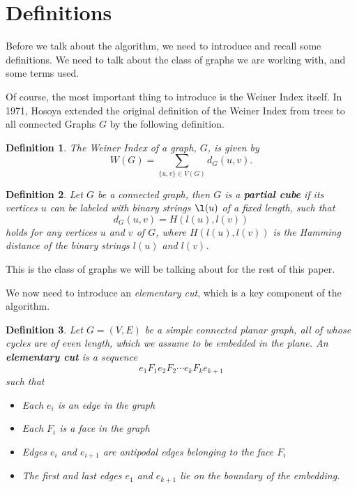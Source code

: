 \documentclass[11pt,a4paper]{article}
\newtheorem{definition}{Definition}
\begin{document}


\section{Definitions} \label{sec:definitions}

Before we talk about the algorithm, we need to introduce and recall some definitions. We need to talk about the class of graphs we are working with, and some terms used.

Of course, the most important thing to introduce is the Weiner Index itself. In 1971, Hosoya extended the original definition of the Weiner Index from trees to all connected Graphs $G$ by the following definition\cite{H1971}.

\begin{definition}
The Weiner Index of a graph, $G$, is given by $$W(G)=\sum_{\{u,v\}\in V(G)}d_G(u,v).$$
\end{definition}

\begin{definition}\cite{K2015}
Let $G$ be a connected graph, then $G$ is a {\bf partial cube} if its vertices $u$ can be labeled with binary strings $\l(u)$ of a fixed length, such that $$d_G(u, v)=H(l(u),l(v))$$ holds for any vertices $u$ and $v$ of $G$, where $H(l(u), l(v))$ is the Hamming distance of the binary strings $l(u)$ and $l(v)$.
\end{definition}

This is the class of graphs we will be talking about for the rest of this paper.

We now need to introduce an \emph{elementary cut}, which is a key component of the algorithm.

\begin{definition}
Let $G=(V, E)$ be a simple connected planar graph, all of whose cycles are of even length, which we assume to be embedded in the plane.  An {\bf elementary cut} is a sequence
$$
e_1F_1e_2F_2 \cdots e_kF_ke_{k+1}
$$
such that
\begin{itemize}
\item Each $e_i$ is an edge in the graph
\item Each $F_i$ is a face in the graph
\item Edges $e_i$ and $e_{i+1}$ are antipodal edges belonging to the face $F_i$
\item The first and last edges $e_1$ and $e_{k+1}$ lie on the boundary of the embedding.
\end{itemize}
\end{definition}
\end{document}

